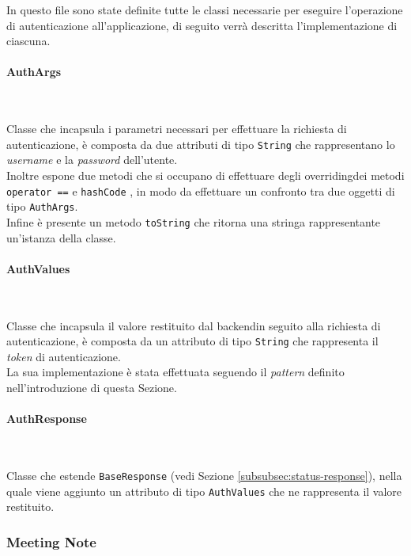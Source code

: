 In questo file sono state definite tutte le classi necessarie per eseguire l'operazione di autenticazione all'applicazione, di seguito verrà descritta l'implementazione di ciascuna.

\paragraph*{AuthArgs} ~ \\
\label{par:auth-args}

\noindent Classe che incapsula i parametri necessari per effettuare la richiesta di autenticazione, è composta da due attributi di tipo \lstinline{String} che rappresentano lo \emph{username} e la \emph{password} dell'utente.\\
Inoltre espone due metodi che si occupano di effettuare degli \gls{overriding}\glsoccur dei metodi \lstinline{operator ==} \cite{site:operator-equals} e \lstinline{hashCode} \cite{site:hascode-property}, in modo da effettuare un confronto tra due oggetti di tipo \lstinline{AuthArgs}.\\
Infine è presente un metodo \lstinline{toString} che ritorna una stringa rappresentante un'istanza della classe.

\paragraph*{AuthValues} ~ \\
\label{par:auth-values}

\noindent Classe che incapsula il valore restituito dal \gls{backend}\glsoccur in seguito alla richiesta di autenticazione, è composta da un attributo di tipo \lstinline{String} che rappresenta il \emph{token} di autenticazione.\\
La sua implementazione è stata effettuata seguendo il \emph{pattern} definito nell'introduzione di questa Sezione.

\paragraph*{AuthResponse} ~ \\
\label{par:auth-response}

\noindent Classe che estende \lstinline{BaseResponse} (vedi Sezione \ref{subsubsec:status-response}), nella quale viene aggiunto un attributo di tipo \lstinline{AuthValues} che ne rappresenta il valore restituito.

\subsubsection*{Meeting Note}
\label{subsubsec:meeting-note}

